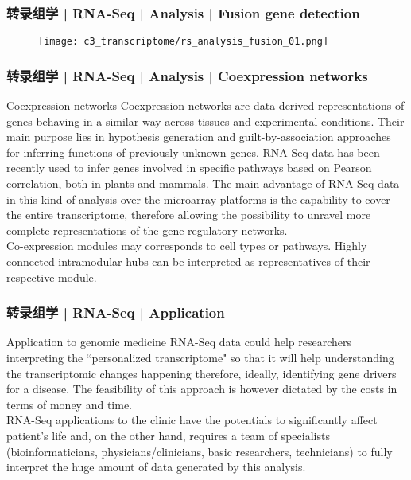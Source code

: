 \begin{frame}
  \frametitle{转录组学 | RNA-Seq | Analysis | Fusion gene detection}
  \begin{figure}
    \centering
    \texttt{[image: c3\_transcriptome/rs\_analysis\_fusion\_01.png]}
  \end{figure}
\end{frame}

\begin{frame}
  \frametitle{转录组学 | RNA-Seq | Analysis | Coexpression networks}
  \begin{block}{Coexpression networks}
    Coexpression networks are data-derived representations of genes behaving in a similar way across tissues and experimental conditions. Their main purpose lies in hypothesis generation and guilt-by-association approaches for inferring functions of previously unknown genes. RNA-Seq data has been recently used to infer genes involved in specific pathways based on Pearson correlation, both in plants and mammals. The main advantage of RNA-Seq data in this kind of analysis over the microarray platforms is the capability to cover the entire transcriptome, therefore allowing the possibility to unravel more complete representations of the gene regulatory networks.\\
 \vspace{0.5em}
 Co-expression modules may corresponds to cell types or pathways. Highly connected intramodular hubs can be interpreted as representatives of their respective module.
  \end{block}
\end{frame}

\begin{frame}
  \frametitle{转录组学 | RNA-Seq | Application}
  \begin{block}{Application to genomic medicine}
  RNA-Seq data could help researchers interpreting the ``personalized transcriptome" so that it will help understanding the transcriptomic changes happening therefore, ideally, identifying gene drivers for a disease. The feasibility of this approach is however dictated by the costs in terms of money and time.\\
  \vspace{1em}
  RNA-Seq applications to the clinic have the potentials to significantly affect patient's life and, on the other hand, requires a team of specialists (bioinformaticians, physicians/clinicians, basic researchers, technicians) to fully interpret the huge amount of data generated by this analysis.
  \end{block}
\end{frame}

